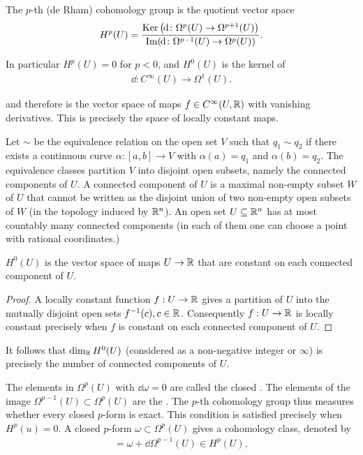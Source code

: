 \begin{definition}\label{definition:3-8}
The $p$-th (de Rham) cohomology group is the quotient vector space
\begin{align*}
  H^p(U) 
  = \frac {\ker\big(\!\dd\colon\Omega^p(U)\to\Omega^{p+1}(U)\big)}
          {\im(\!\dd\colon\Omega^{p-1}(U)\to\Omega^p(U))}.
\end{align*}

In particular $H^p(U) = 0$ for $p<0$, and $H^0(U)$ is the kernel of
\begin{align*}
  \dd:C^\infty(U)\to\Omega^1(U).
\end{align*}

and therefore is the vector space of maps $f\in C^\infty(U, {\mathbb{R}})$ with vanishing 
derivatives. This is precisely the space of locally constant maps.

Let $\sim$ be the equivalence relation on the open set $V$ such that $q_1\sim q_2$ if there
exists a continuous curve $\alpha: [a, b]\to V$ with $\alpha(a) = q_1$ and $\alpha(b) = q_2$. The
equivalence classes partition $V$ into disjoint open subsets, namely the connected components of $U$. 
A connected component of $U$ is a maximal non-empty subset $W$ of $U$ that cannot be written as the 
disjoint union of two non-empty open subsets of $W$ (in the topology induced by ${\mathbb{R}}^n$). An open 
set $U\subseteq{\ensuremath{\mathbb{R}}}^n$ has at most countably many connected components (in each of them one can choose 
a point with rational coordinates.)
\end{definition}



\begin{lemma}\label{lemma:3-9}
  $H^0(U)$ is the vector space of maps $U\to {\ensuremath{\mathbb{R}}}$ that are constant on each
connected component of $U$.
\end{lemma}

\begin{proof}
  A locally constant function $f:U\to{\ensuremath{\mathbb{R}}}$ gives a partition of $U$ into the
mutually disjoint open sets $f^{-1}(c), c\in{\ensuremath{\mathbb{R}}}$. Consequently $f:U\to{\ensuremath{\mathbb{R}}}$ is locally
constant precisely when $f$ is constant on each connected component of $U$.
\end{proof}

It follows that $\dim_{{\mathbb{R}}} H^0(U)$ (considered as a non-negative integer or $\infty$) is precisely
the number of connected components of $U$.


The elements in $\Omega^p(U)$ with $\dd\omega = 0$ are called the closed . The elements
of the image $\Omega^{p-1}(U)\subset\Omega^p(U)$ are the . The $p$-th cohomology
group thus measures whether every closed $p$-form is exact. This condition is
satisfied precisely when $H^p(u) = 0$. A closed $p$-form $\omega\subset\Omega^p(U)$ gives a
cohomology class, denoted by
\begin{align*}
  [\omega] = \omega + \dd\Omega^{p-1}(U) \in H^p(U),
\end{align*}

